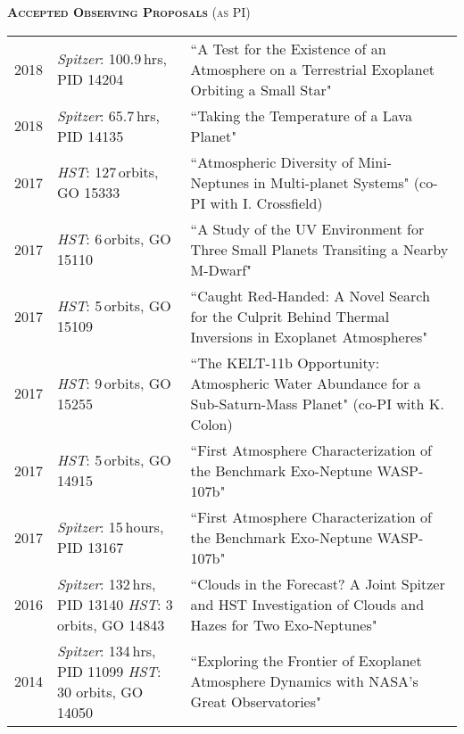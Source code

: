 \documentclass[12pt,letterpaper]{article}
\begin{document}
\textbf{\textsc{Accepted Observing Proposals}} \textsc{(as PI)}
\vspace{3mm}

\begin{tabular}{ l p{5.0cm} p{10cm}}
  2018 & \textit{Spitzer}: 100.9\,hrs, PID 14204 & ``A Test for the Existence of an Atmosphere on a Terrestrial Exoplanet 
    Orbiting a Small Star"\\
  2018 &  \textit{Spitzer}: 65.7\,hrs, PID 14135 & ``Taking the Temperature of a Lava Planet"\\
  2017 &  \textit{HST}: 127\,orbits, GO 15333& ``Atmospheric Diversity of Mini-Neptunes in Multi-planet Systems" (co-PI with I. Crossfield)\\
  2017 &  \textit{HST}: 6\,orbits, GO 15110& ``A Study of the UV Environment for Three Small Planets Transiting a Nearby M-Dwarf" \\
  2017 &  \textit{HST}: 5\,orbits, GO 15109& ``Caught Red-Handed: A Novel Search for the Culprit Behind Thermal Inversions in Exoplanet Atmospheres" \\
  2017 &  \textit{HST}: 9\,orbits, GO 15255& ``The KELT-11b Opportunity: Atmospheric Water Abundance for a Sub-Saturn-Mass Planet" (co-PI with K. Colon)\\
 2017 & \textit{HST}: 5\,orbits, GO 14915 & ``First Atmosphere Characterization of the Benchmark Exo-Neptune WASP-107b"\\
 2017 & \textit{Spitzer}: 15\,hours, PID 13167& ``First Atmosphere Characterization of the Benchmark Exo-Neptune WASP-107b"\\
2016 & \textit{Spitzer}: 132\,hrs, PID 13140 \textit{HST}: 3 orbits, GO 14843 & ``Clouds in the Forecast? A Joint Spitzer and HST Investigation of Clouds and Hazes for Two Exo-Neptunes"\\
2014 & \textit{Spitzer}: 134\,hrs, PID 11099 \textit{HST}: 30 orbits, GO 14050& ``Exploring the Frontier of Exoplanet Atmosphere Dynamics with NASA's Great Observatories"
\end{tabular}
\end{document}
